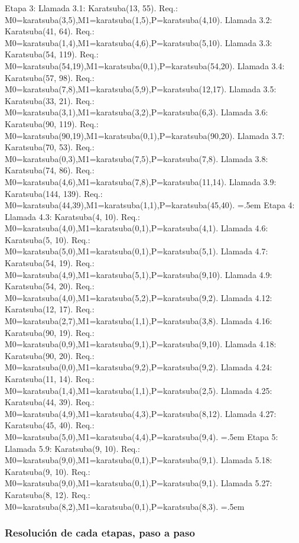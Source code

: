 \documentclass[titlepage,a4paper]{article}
\newenvironment{lcverbatim}
 {\SaveVerbatim{cverb}}
 {\endSaveVerbatim
  \flushleft\fboxrule=0pt\fboxsep=.5em
  \colorbox{cverbbg}{%
    \makebox[\dimexpr\linewidth-2\fboxsep][l]{\BUseVerbatim{cverb}}%
  }
  \endflushleft
}
\begin{document}
\begin{lcverbatim}
Etapa 3:
	Llamada 3.1: Karatsuba(13, 55). Req.:
		M0=karatsuba(3,5),M1=karatsuba(1,5),P=karatsuba(4,10).
	Llamada 3.2: Karatsuba(41, 64). Req.:
		M0=karatsuba(1,4),M1=karatsuba(4,6),P=karatsuba(5,10).
	Llamada 3.3: Karatsuba(54, 119). Req.:
		M0=karatsuba(54,19),M1=karatsuba(0,1),P=karatsuba(54,20).
	Llamada 3.4: Karatsuba(57, 98). Req.:
		M0=karatsuba(7,8),M1=karatsuba(5,9),P=karatsuba(12,17).
	Llamada 3.5: Karatsuba(33, 21). Req.:
		M0=karatsuba(3,1),M1=karatsuba(3,2),P=karatsuba(6,3).
	Llamada 3.6: Karatsuba(90, 119). Req.:
		M0=karatsuba(90,19),M1=karatsuba(0,1),P=karatsuba(90,20).
	Llamada 3.7: Karatsuba(70, 53). Req.:
		M0=karatsuba(0,3),M1=karatsuba(7,5),P=karatsuba(7,8).
	Llamada 3.8: Karatsuba(74, 86). Req.:
		M0=karatsuba(4,6),M1=karatsuba(7,8),P=karatsuba(11,14).
	Llamada 3.9: Karatsuba(144, 139). Req.:
		M0=karatsuba(44,39),M1=karatsuba(1,1),P=karatsuba(45,40).
\end{lcverbatim}
\begin{lcverbatim}
Etapa 4:
	Llamada 4.3: Karatsuba(4, 10). Req.:
		M0=karatsuba(4,0),M1=karatsuba(0,1),P=karatsuba(4,1).
	Llamada 4.6: Karatsuba(5, 10). Req.:
		M0=karatsuba(5,0),M1=karatsuba(0,1),P=karatsuba(5,1).
	Llamada 4.7: Karatsuba(54, 19). Req.:
		M0=karatsuba(4,9),M1=karatsuba(5,1),P=karatsuba(9,10).
	Llamada 4.9: Karatsuba(54, 20). Req.:
		M0=karatsuba(4,0),M1=karatsuba(5,2),P=karatsuba(9,2).
	Llamada 4.12: Karatsuba(12, 17). Req.:
		M0=karatsuba(2,7),M1=karatsuba(1,1),P=karatsuba(3,8).
	Llamada 4.16: Karatsuba(90, 19). Req.:
		M0=karatsuba(0,9),M1=karatsuba(9,1),P=karatsuba(9,10).
	Llamada 4.18: Karatsuba(90, 20). Req.:
		M0=karatsuba(0,0),M1=karatsuba(9,2),P=karatsuba(9,2).
	Llamada 4.24: Karatsuba(11, 14). Req.:
		M0=karatsuba(1,4),M1=karatsuba(1,1),P=karatsuba(2,5).
	Llamada 4.25: Karatsuba(44, 39). Req.:
		M0=karatsuba(4,9),M1=karatsuba(4,3),P=karatsuba(8,12).
	Llamada 4.27: Karatsuba(45, 40). Req.:
		M0=karatsuba(5,0),M1=karatsuba(4,4),P=karatsuba(9,4).
\end{lcverbatim}
\begin{lcverbatim}
Etapa 5:
	Llamada 5.9: Karatsuba(9, 10). Req.:
		M0=karatsuba(9,0),M1=karatsuba(0,1),P=karatsuba(9,1).
	Llamada 5.18: Karatsuba(9, 10). Req.:
		M0=karatsuba(9,0),M1=karatsuba(0,1),P=karatsuba(9,1).
	Llamada 5.27: Karatsuba(8, 12). Req.:
		M0=karatsuba(8,2),M1=karatsuba(0,1),P=karatsuba(8,3).
\end{lcverbatim}

\newpage\subsubsection{Resolución de cada etapas, paso a paso}
\end{document}
